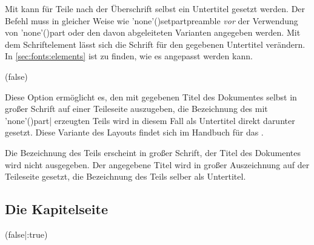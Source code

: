 \begin{DeclareEntity*}{}
\begin{DeclareEntity*}{}
\begin{DeclareEntity*}{}
\begin{Declaration}
\begin{Declaration}
Mit  kann für Teile nach der 
Überschrift selbst ein Untertitel gesetzt werden. Der Befehl muss in gleicher 
Weise wie \Macro'none'(){setpartpreamble} \emph{vor} der 
Verwendung von \Macro'none'(){part} oder den davon 
abgeleiteten Varianten angegeben werden. Mit dem Schriftelement 
 lässt sich die Schrift für den gegebenen Untertitel 
verändern. In \autoref{sec:fonts:elements} ist zu finden, wie es angepasst 
werden kann.
\end{Declaration}
\end{Declaration}

\begin{Declaration}
  {}
  (false)
\printdeclarationlist

Diese Option ermöglicht es, den mit  gegebenen Titel des 
Dokumentes selbst in großer Schrift auf einer Teileseite auszugeben, die 
Bezeichnung des mit 
\Macro'none'(){part|} erzeugten 
Teils wird in diesem Fall als Untertitel direkt darunter gesetzt. Diese 
Variante des Layouts findet sich im Handbuch für das \TUDCD. \notudscrartcl
\begin{DeclareValues}{}
  Die Bezeichnung des Teils erscheint in großer Schrift, der Titel des 
  Dokumentes wird nicht ausgegeben.
  Der angegebene Titel wird in großer Auszeichnung auf der Teileseite gesetzt,
  die Bezeichnung des Teils selber als Untertitel.
\end{DeclareValues}
\end{Declaration}
%
%



\subsection{%
  Die Kapitelseite%
  \label{sec:chapter}%
}

\begin{Declaration}
  {}
  (false|:true)


\end{Declaration}
\end{DeclareEntity*}
\end{DeclareEntity*}
\end{DeclareEntity*}
